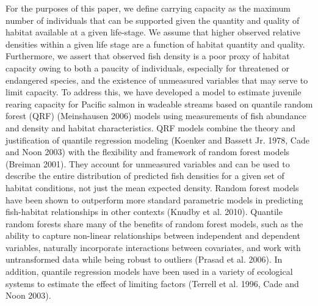 \documentclass[
  12pt,
]{article}
\begin{document}
For the purposes of this paper, we define carrying capacity as the maximum number of individuals that can be supported given the quantity and quality of habitat available at a given life-stage. We assume that higher observed relative densities within a given life stage are a function of habitat quantity and quality. Furthermore, we assert that observed fish density is a poor proxy of habitat capacity owing to both a paucity of individuals, especially for threatened or endangered species, and the existence of unmeasured variables that may serve to limit capacity. To address this, we have developed a model to estimate juvenile rearing capacity for Pacific salmon in wadeable streams based on quantile random forest (QRF) (Meinshausen 2006) models using measurements of fish abundance and density and habitat characteristics. QRF models combine the theory and justification of quantile regression modeling (Koenker and Bassett Jr. 1978, Cade and Noon 2003) with the flexibility and framework of random forest models (Breiman 2001). They account for unmeasured variables and can be used to describe the entire distribution of predicted fish densities for a given set of habitat conditions, not just the mean expected density. Random forest models have been shown to outperform more standard parametric models in predicting fish-habitat relationships in other contexts (Knudby et al. 2010). Quantile random forests share many of the benefits of random forest models, such as the ability to capture non-linear relationships between independent and dependent variables, naturally incorporate interactions between covariates, and work with untransformed data while being robust to outliers (Prasad et al. 2006). In addition, quantile regression models have been used in a variety of ecological systems to estimate the effect of limiting factors (Terrell et al. 1996, Cade and Noon 2003).
\end{document}
